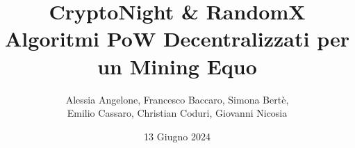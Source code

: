 \documentclass{report}[12pt]
\title{%
  \vspace{-2cm}
  \Huge \textbf{CryptoNight \& RandomX} \\
  \vspace{0.5cm}
  \LARGE Algoritmi PoW Decentralizzati per un Mining Equo \\
  \vspace{1cm}
}
\author{Alessia Angelone, Francesco Baccaro, Simona Bertè, \\ Emilio Cassaro, Christian Coduri, Giovanni Nicosia}
\date{13 Giugno 2024}
\begin{document}
\maketitle
\tableofcontents




\graphicspath{{./images/}}






\end{document}
